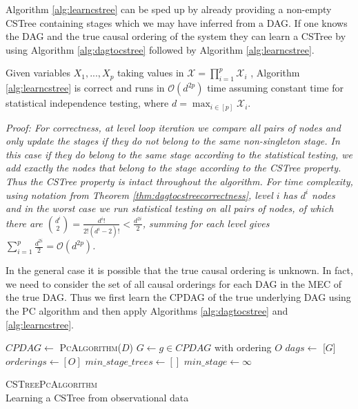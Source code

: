 \documentclass{tufte-book}
\begin{document}
Algorithm \ref{alg:learncstree} can be sped up by already providing a non-empty CSTree containing stages which we may have inferred from a DAG. If one knows the DAG and the true causal ordering of the system they can learn a CSTree by using Algorithm \ref{alg:dagtocstree} followed by Algorithm \ref{alg:learncstree}.


\begin{theorem}\label{thm:learncstreecorrectness}
Given variables $X_1,...,X_p$ taking values in $\mathcal{X}=\prod_{i=1}^p \mathcal{X}_i$ , Algorithm \ref{alg:learncstree} is correct and runs in $\mathcal{O}(d^{2p})$ time assuming constant time for statistical independence testing, where $d=\max_{i \in [p]}\mathcal{X}_i$.

\end{theorem}

\textit{Proof:
For correctness, at level loop iteration we compare all pairs of nodes and only update the stages if they do not belong to the same non-singleton stage. In this case if they do belong to the same stage according to the statistical testing, we add exactly the nodes that belong to the stage according to the CSTree property. Thus the CSTree property is intact throughout the algorithm. For time complexity, using notation from Theorem \ref{thm:dagtocstreecorrectness}, level $i$ has $d^i$ nodes and in the worst case we run statistical testing on all pairs of nodes, of which there are ${d^i \choose 2} = \frac{d^i !}{2! (d^i - 2)!} < \frac{d^{2i}}{2}$, summing for each level gives $\sum_{i=1}^p \frac{d^{2i}}{2}  = \mathcal{O}(d^{2p})$.
}

In the general case it is possible that the true causal ordering is unknown. In fact, we need to consider the set of all causal orderings for each DAG in the MEC of the true DAG. Thus we first learn the CPDAG of the true underlying DAG using the PC algorithm and then apply Algorithms \ref{alg:dagtocstree} and \ref{alg:learncstree}.

\begin{algorithm}\label{alg:cstreepc}
\SetAlgoLined
{}
$CPDAG \gets$ \textsc{PcAlgorithm}($D$)\;
{
$G \gets g \in CPDAG$ with ordering $O$\;
$dags \gets$ [$G$]\;
$orderings \gets [O]$\;
}
$min\_stage\_trees \gets []$\;
$min\_stage \gets \infty$\;
\caption{\textsc{CSTreePcAlgorithm} \\ Learning a CSTree from observational data}

\end{algorithm}
\end{document}
